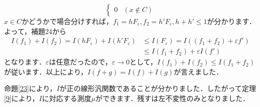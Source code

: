 \begin{Proof}
\[\begin{cases}
0 & (x \not\in C)
\end{cases}
\]
$x \in C$かどうかで場合分けすれば，$f_{1}=hF_{\varepsilon}, f_{2}=h'F_{\varepsilon}, h+h' \le 1$が分かります．よって，補題24から
\begin{align*}
I(f_1)+I(f_2) = I(hF_{\varepsilon})+I(h'F_{\varepsilon}) & \le I(F_{\varepsilon})=I ( (f_{1}+f_{2})+\varepsilon f' ) \\
& \le I(f_{1}+f_{2})+ \varepsilon I(f')
\end{align*}
となります．$\varepsilon$は任意だったので，$\varepsilon \to 0$として，$I(f_1)+I(f_2) \le I(f_{1}+f_{2})$が従います．以上により，$I(f+g)=I(f)+I(g)$が言えました．　
\end{Proof}

命題\ref{23}により，$I$が正の線形汎関数であることが分かりました．したがって定理\ref{9}により，$I$に対応する測度$\mu$ができます．残すは左不変性のみとなりました．

